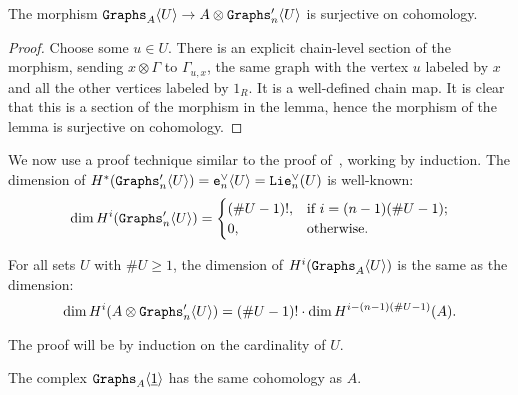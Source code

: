 \begin{lemma}
  \label{cnf.lemma.graphs-a-surj}
  The morphism $\mathtt{Graphs}_{A} \langle U \rangle \to A \otimes \mathtt{Graphs}'_{n} \langle U \rangle$ is surjective on cohomology.
\end{lemma}

\begin{proof}
  Choose some $u \in U$.
  There is an explicit chain-level section of the morphism, sending $x \otimes \Gamma$ to $\Gamma_{u,x}$, the same graph with the vertex $u$ labeled by $x$ and all the other vertices labeled by $1_{R}$.
  It is a well-defined chain map.
  It is clear that this is a section of the morphism in the lemma, hence the morphism of the lemma is surjective on cohomology.
\end{proof}

We now use a proof technique similar to the proof of~\cite[Lemma 8.3]{LambrechtsVolic2014}, working by induction.
The dimension of $H^{*}(\mathtt{Graphs}'_{n}\langle U \rangle) = \mathtt{e}_{n}^{\vee} \langle U \rangle = \mathtt{Lie}_{n}^{\vee}(U)$ is well-known:
\begin{equation}
  \label{cnf.eq.dim-graphs_n}
  \dim H^{i} ( \mathtt{Graphs}'_{n} \langle U \rangle ) =
  \begin{cases}
    (\#U - 1) !, & \text{if } i = (n-1)(\#U - 1); \\
    0, & \text{otherwise.}
  \end{cases}
\end{equation}

\begin{lemma}
  \label{cnf.lemma.same-cohomology}
  For all sets $U$ with $\#U \geq 1$, the dimension of $H^{i}(\mathtt{Graphs}_{A} \langle U \rangle)$ is the same as the dimension:
  \begin{equation*}
    \dim H^{i}(A \otimes \mathtt{Graphs}'_{n} \langle U \rangle) = (\#U - 1)! \cdot \dim H^{i - (n-1)(\#U-1)}(A).
  \end{equation*}
\end{lemma}

The proof will be by induction on the cardinality of $U$.

\begin{lemma}
  \label{cnf.lemma.case-u-1}
  The complex $\mathtt{Graphs}_{A} \langle \underline{1} \rangle$ has the same cohomology as $A$.
\end{lemma}


